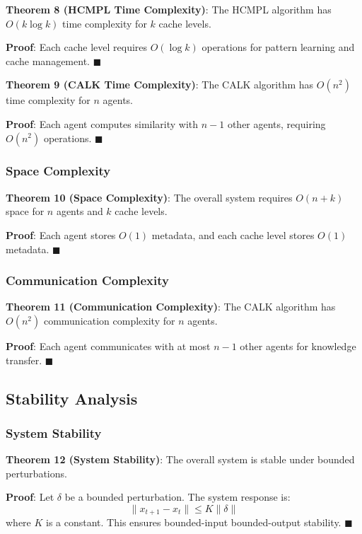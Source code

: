 \documentclass[conference]{IEEEtran}
\begin{document}
\textbf{Theorem 8 (HCMPL Time Complexity)}: The HCMPL algorithm has $O(k \log k)$ time complexity for $k$ cache levels.

\textbf{Proof}: Each cache level requires $O(\log k)$ operations for pattern learning and cache management. $\blacksquare$

\textbf{Theorem 9 (CALK Time Complexity)}: The CALK algorithm has $O(n^2)$ time complexity for $n$ agents.

\textbf{Proof}: Each agent computes similarity with $n-1$ other agents, requiring $O(n^2)$ operations. $\blacksquare$

\subsubsection{Space Complexity}

\textbf{Theorem 10 (Space Complexity)}: The overall system requires $O(n + k)$ space for $n$ agents and $k$ cache levels.

\textbf{Proof}: Each agent stores $O(1)$ metadata, and each cache level stores $O(1)$ metadata. $\blacksquare$

\subsubsection{Communication Complexity}

\textbf{Theorem 11 (Communication Complexity)}: The CALK algorithm has $O(n^2)$ communication complexity for $n$ agents.

\textbf{Proof}: Each agent communicates with at most $n-1$ other agents for knowledge transfer. $\blacksquare$

\subsection{Stability Analysis}

\subsubsection{System Stability}

\textbf{Theorem 12 (System Stability)}: The overall system is stable under bounded perturbations.

\textbf{Proof}: Let $\delta$ be a bounded perturbation. The system response is:
\begin{equation}
\|x_{t+1} - x_t\| \leq K\|\delta\|
\end{equation}
where $K$ is a constant. This ensures bounded-input bounded-output stability. $\blacksquare$
\end{document}
